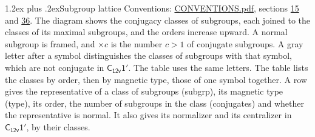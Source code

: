 \documentclass[10pt,a4paper]{article}
\makeatletter
\renewcommand\section{\@startsection{section}{1}{\z@}{-3ex plus -1ex minus -.2ex}%
  {1.2ex plus .2ex}{\normalfont\large\sffamily\bfseries\color{parttitle}}}
\numberwithin{equation}{section}
\newcommand{\grp}[1]{\mathsf{#1}}
\makeatother
\begin{document}
\section{Subgroup lattice}\label{s:subgroups}
Conventions: \href{../../CONVENTIONS.pdf}{CONVENTIONS.pdf}, sections \href{../../../rotation/CONVENTIONS.pdf\#conv.15}{15} and \href{../../CONVENTIONS.pdf\#conv.36}{36}.
The diagram shows the conjugacy classes of subgroups, each joined to the classes of its maximal subgroups, and the orders increase upward. \label{n:index.conjugates.c}\label{n:mark.conjugates}A normal subgroup is framed, and ${\times}c$ is the number $c > 1$ of conjugate subgroups. \label{n:mark.letter}A gray letter after a symbol distinguishes the classes of subgroups with that symbol, which are not conjugate in $\grp{C_{12v}1'}$. The table uses the same letters. The table lists the classes by order, then by magnetic type, those of one symbol together. \label{n:head.subgroup}\label{n:head.magnetic.type}\label{n:head.order}\label{n:head.conjugates}\label{n:head.normal}A row gives the representative of a class of subgroups (subgrp), its magnetic type (type), its order, the number of subgroups in the class (conjugates) and whether the representative is normal. \label{n:head.normalizer}\label{n:head.centralizer}It also gives its normalizer and its centralizer in $\grp{C_{12v}1'}$, by their classes. 
\end{document}
